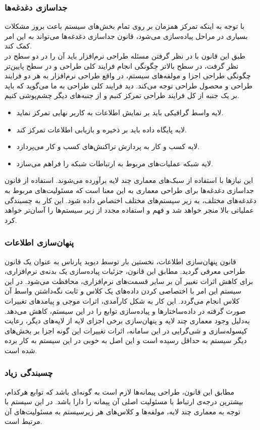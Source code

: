 \documentclass[12pt]{article}
\begin{document}
	\subsubsection{جداسازی دغدغه‌ها}
	با توجه به اینکه تمرکز همزمان بر روی تمام بخش‌های سیستم باعث بروز مشکلات بسیاری در مراحل پیاده‌سازی می‌شود، قانون جداسازی ‌دغدغه‌ها می‌تواند به این امر کمک کند.\\
	طبق این قانون با در نظر گرفتن مسئله طراحی نرم‌افزار باید آن را در دو سطح در نظر گرفت، در سطح بالاتر چگونگی انجام فرایند کلی طراحی و در سطح پایین‌تر چگونگی طراحی اجزا و مولفه‌های سیستم، در واقع طراحی نرم‌افزار به هر دو فرایند طراحی و محصول طراحی توجه می‌کند. دید فرایند کلی طراحی به ما می‌گوید که باید بر یک جنبه از کل فرایند طراحی تمرکز کنیم و از جنبه‌های دیگر چشم‌پوشی کنیم.

	\begin{itemize}
		\item
		لایه واسط گرافیکی باید بر نمایش اطلاعات به کاربر نهایی تمرکز نماید.
		\item
		لایه پایگاه داده باید بر ذخیره و بازیابی اطلاعات تمرکز کند.
		\item
		لایه کسب و کار به پردازش تراکنش‌های کسب و کار می‌پردازد.
		\item
		لایه شبکه عملیات‌های مربوط به ارتباطات شبکه را فراهم می‌سازد.
	\end{itemize}
	این نیازها با استفاده از سبک‌های معماری چند لایه برآورده می‌شوند. استفاده از قانون جداسازی دغدغه‌ها برای طراحی معماری به این معنا است که مسئولیت‌های مربوط به دغدغه‌های مختلف، به زیر سیستم‌های مختلف اختصاص داده شود. این کار به چسبندگی عملیاتی بالا منجر خواهد شد و فهم و استفاده مجدد از زیر سیستم‌ها را آسان‌تر خواهد کرد.
	\subsubsection{پنهان‌سازی اطلاعات}
	قانون پنهان‌سازی اطلاعات، نخستین بار توسط دیوید پارناس به عنوان یک قانون طراحی معرفی گردید. مطابق این قانون، جزئیات پیاده‌سازی یک بدنه‌ی نرم‌افزاری، برای کاهش اثرات تغییر آن بر سایر قسمت‌های نرم‌افزاری، محافظت می‌شود. در این سیستم این امر با اختصاصی کردن داده‌های یک کلاس و ثابت نگه‌داشتن واسط آن کلاس انجام می‌‌گردد. این کار به شکل کارآمدی، اثرات موجی و پیامدهای تغییرات صورت گرفته در داده‌ساختارها و پیاده‌سازی توابع را در این سیستم، کاهش می‌دهد. به‌دلیل وجود معماری چند لایه و پنهان‌سازی برخی اجزای لایه از لایه‌های دیگر، رعایت کپسوله‌سازی و شی‌گرایی در این سامانه، اثرات تغییرات این گونه اجزا بر بخش‌های دیگر سیستم به حداقل رسیده است و این اصل به خوبی در این سیستم به کار برده شده است.
	\subsubsection{چسبندگی زیاد}
	مطابق این قانون، طراحی پیمانه‌ها لازم است به گونه‌ای باشد که توابع هر‌کدام، بیشترین درجه‌ی ارتباط با مسئولیت اصلی آن پیمانه را دارا باشد. در این سیستم با توجه به معماری چند لایه، مولفه‌ها و کلاس‌های هر زیرسیستم به مسئولیت‌های آن مرتبط است.
\end{document}
